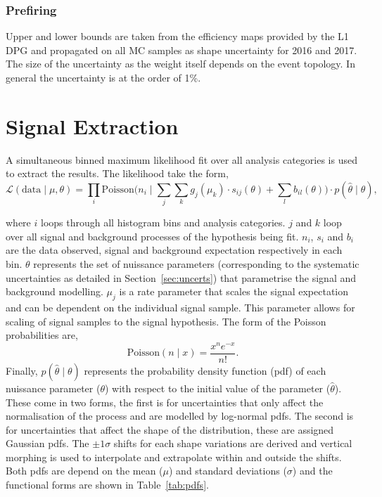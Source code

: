 \subsubsection{Prefiring}
Upper and lower bounds are taken from the efficiency maps provided by the L1 DPG and propagated on all MC samples as shape uncertainty for 2016 and 2017.
The size of the uncertainty as the weight itself depends on the event topology. In general the uncertainty is at the order of 1\%.

\newpage
\section{Signal Extraction}
\label{sec:sig_ext}

A simultaneous binned maximum likelihood fit over all analysis categories is used to extract the results.
The likelihood take the form,
\begin{equation}
\mathcal{L}(\text{data}\mid\mu,\theta) = \prod_i \text{Poisson} \Big(n_{i} \mid \sum_{j}\sum_{k} g_{j}(\mu_k) \cdot s_{ij}(\theta) + \sum_{l} b_{il}(\theta)\Big) \cdot p(\hat{\theta} \mid \theta),
\end{equation}

where $i$ loops through all histogram bins and analysis categories.
$j$ and $k$ loop over all signal and background processes of the hypothesis being fit.
$n_i$, $s_i$ and $b_i$ are the data observed, signal and background expectation respectively in each bin.
$\theta$ represents the set of nuissance parameters (corresponding to the systematic uncertainties as detailed in Section~\ref{sec:uncerts}) that parametrise the signal and background modelling.
$\mu_{j}$ is a rate parameter that scales the signal expectation and can be dependent on the individual signal sample.
This parameter allows for scaling of signal samples to the signal hypothesis.
The form of the Poisson probabilities are,
\begin{equation}
\text{Poisson} (n \mid x) = \frac{x^{n}e^{-x}}{n!}.
\end{equation}
Finally, $p(\hat{\theta} \mid \theta)$ represents the probability density function (pdf) of each nuissance parameter ($\theta$) with respect to the initial value of the parameter ($\hat{\theta}$). \\

These come in two forms, the first is for uncertainties that only affect the normalisation of the process and are modelled by log-normal pdfs. 
The second is for uncertainties that affect the shape of the distribution, these are assigned Gaussian pdfs.
The $\pm1\sigma$ shifts for each shape variations are derived and vertical morphing \cite{} is used to interpolate and extrapolate within and outside the shifts.
Both pdfs are depend on the mean ($\mu$) and standard deviations ($\sigma$) and the functional forms are shown in Table~\ref{tab:pdfs}. \\

